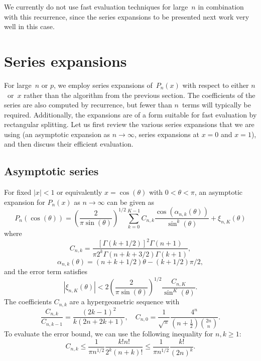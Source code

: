 \documentclass{siamart0216}
\begin{document}
We currently do not use fast evaluation techniques for large~$n$ in
combination with this recurrence, since the series expansions to be
presented next work very well in this case.

\section{Series expansions}

\label{sec:series}

For large $n$ or $p$, we employ series expansions of $P_n(x)$ with
respect to either $n$ or $x$ rather than the algorithm from the
previous section.
The coefficients of the series are also computed by recurrence,
but fewer than $n$ terms will typically be required.
Additionally, the expansions are of a form suitable for fast
evaluation by rectangular splitting.
Let us first review the various series expansions that we are using
(an asymptotic expansion as $n \to \infty$, series expansions at $x=0$
and $x=1$), and then discuss their efficient evaluation.

\subsection{Asymptotic series}

\label{sec:series-asy}

For fixed $|x| < 1$ or equivalently $x = \cos(\theta)$ with $0 < \theta < \pi$,
an asymptotic expansion for $P_n(x)$ as $n \to \infty$
can be given as \cite[Eq.~3.4]{Bogaert2012}
\begin{equation}
\label{eq:asymptotic}
P_n(\cos(\theta)) = \left(\frac{2}{\pi \sin(\theta)}\right)^{1/2}
\sum_{k=0}^{K-1} C_{n,k} \frac{\cos(\alpha_{n,k}(\theta))}{\sin^k(\theta)}
+ \xi_{n,K}(\theta)
\end{equation}
where
\begin{equation}
C_{n,k} = \frac{[\Gamma(k+1/2)]^2 \Gamma(n+1)}{\pi 2^k \Gamma(n+k+3/2) \Gamma(k+1)},
\end{equation}
\begin{equation}
\alpha_{n,k}(\theta) = (n+k+1/2) \theta - (k+1/2) \pi / 2,
\end{equation}
and the error term satisfies
\begin{equation}
\label{eq:truncerr0}
|\xi_{n,K}(\theta)| < 2 \left(\frac{2}{\pi \sin(\theta)}\right)^{1/2} \frac{C_{n,K}}{\sin^K(\theta)}.
\end{equation}
The coefficients $C_{n,k}$ are a hypergeometric sequence with
$$\frac{C_{n,k}}{C_{n,k-1}} = \frac{(2k-1)^2}{k (2n+2k+1)}, \quad C_{n,0} = \frac{1}{\sqrt{\pi}} \frac{4^n}{(n+\tfrac{1}{2}) {2n \choose n}}.$$
To evaluate the error bound, we can use the following inequality for $n, k \ge 1$:
\begin{equation}
\label{eq:truncerr0b}
C_{n,k} \le \frac{1}{\pi n^{1/2}} \frac{k! n!}{2^k (n+k)!} \le \frac{1}{\pi n^{1/2}} \frac{k!}{(2n)^k}.
\end{equation}
\end{document}
